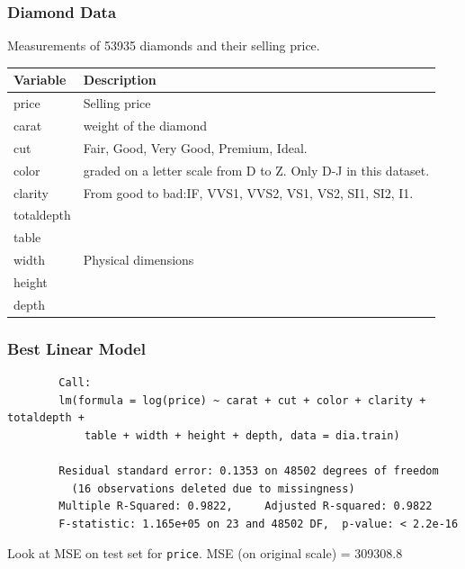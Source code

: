 \documentclass{beamer}
\begin{document}
\begin{frame}
	\frametitle{Diamond Data}
	Measurements of 53935 diamonds and their selling price. 
\begin{tabular}{lp{8cm}}
\hline
Variable & Description\\
\hline
price & Selling price\\
carat & weight of the diamond\\
cut & Fair, Good,  Very Good, Premium, Ideal.\\
color & graded on a letter scale from D to Z. Only D-J in this dataset.\\
clarity & From good to bad:IF, VVS1, VVS2, VS1, VS2, SI1, SI2, I1. \\
totaldepth &  \multirow{5}{*}{Physical dimensions}\\
table & \\
width &\\
height &\\
depth &\\
\hline
\end{tabular}
\end{frame}

\begin{frame}[fragile]
	\frametitle{Best Linear Model}
	\begin{tiny}
	\begin{verbatim}
		Call:
		lm(formula = log(price) ~ carat + cut + color + clarity + totaldepth + 
		    table + width + height + depth, data = dia.train)

		Residual standard error: 0.1353 on 48502 degrees of freedom
		  (16 observations deleted due to missingness)
		Multiple R-Squared: 0.9822,     Adjusted R-squared: 0.9822 
		F-statistic: 1.165e+05 on 23 and 48502 DF,  p-value: < 2.2e-16 
	\end{verbatim}
	
	\end{tiny}	
	Look at MSE on test set for \verb|price|.
	MSE (on original scale) = 309308.8
	
\end{frame}
\end{document}
